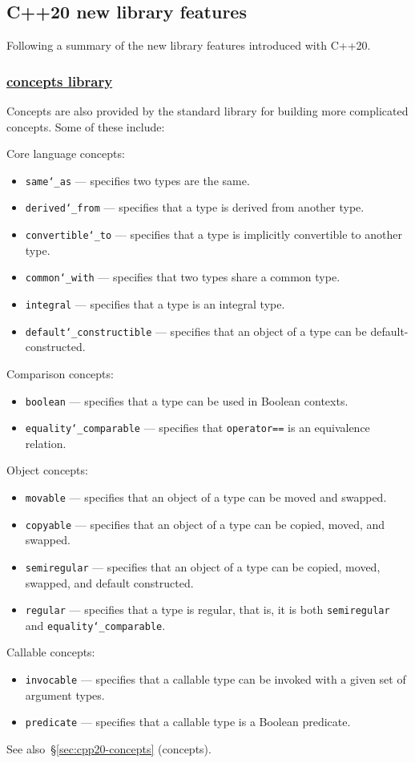 \subsection{C++20  new library features}
Following a summary of the new library features introduced with C++20.
\subsubsection{\href{https://github.com/AnthonyCalandra/modern-cpp-features/tree/master\#concepts-library}
                    {concepts library}}
\label{sec:cpp20-concepts-library}
Concepts are also provided by the standard library for building more complicated concepts. Some of these include:

Core language concepts:
  \begin{itemize}
    \item \texttt{same\char`_as} --- specifies two types are the same.
    \item \texttt{derived\char`_from} --- specifies that a type is derived from another type.
    \item \texttt{convertible\char`_to} --- specifies that a type is implicitly convertible to another type.
    \item \texttt{common\char`_with} --- specifies that two types share a common type.
    \item \texttt{integral} --- specifies that a type is an integral type.
    \item \texttt{default\char`_constructible} --- specifies that an object of a type can be default-constructed.
  \end{itemize}
Comparison concepts:
  \begin{itemize}
    \item \texttt{boolean} --- specifies that a type can be used in Boolean contexts.
    \item \texttt{equality\char`_comparable} --- specifies that \texttt{operator==} is an equivalence relation.
  \end{itemize}
Object concepts:
  \begin{itemize}
    \item \texttt{movable} --- specifies that an object of a type can be moved and swapped.
    \item \texttt{copyable} --- specifies that an object of a type can be copied, moved, and swapped.
    \item \texttt{semiregular} --- specifies that an object of a type can be copied, moved, swapped, and default constructed.
    \item \texttt{regular} --- specifies that a type is regular, that is, it is both \texttt{semiregular} and \texttt{equality\char`_comparable}.
  \end{itemize}
Callable concepts:
  \begin{itemize}
    \item \texttt{invocable} --- specifies that a callable type can be invoked with a given set of argument types.
    \item \texttt{predicate} --- specifies that a callable type is a Boolean predicate.
  \end{itemize}
See also~\S\ref{sec:cpp20-concepts} (concepts).

